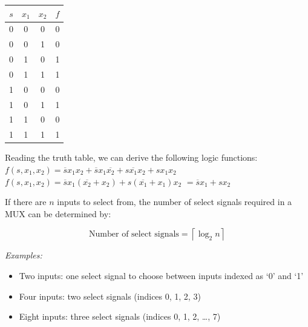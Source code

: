 \documentclass[12pt,openany]{book}
\begin{document}
					\begin{minipage}[htp]{0.45\textwidth}

					\begin{center}
					\begin{tabular}{|c|c|c|c|}
					\hline
					$s$ & $x_1$ & $x_2$ & $f$ \\
					\hline
					0   & 0     & 0     & 0   \\
					0   & 0     & 1     & 0   \\
					0   & 1     & 0     & 1   \\
					0   & 1     & 1     & 1   \\
					1   & 0     & 0     & 0   \\
					1   & 0     & 1     & 1   \\
					1   & 1     & 0     & 0   \\
					1   & 1     & 1     & 1   \\
					\hline
					\end{tabular}
					\end{center}
						
					\end{minipage}
					\hfill
					\vline
					\hfill
					\begin{minipage}[htp]{0.45\textwidth}
					Reading the truth table, we can derive the following logic functions:\newline
					\vspace*{3px}
			      	$f(s, x_1, x_2) = \overline{s} x_1 x_2 + \overline{s} x_1 \overline{x_2} + s \overline{x_1} x_2 + s x_1 x_2$\newline
			      	$f(s, x_1, x_2) = \overline{s}x_1 (\overline{x_2} + x_2) + s(\overline{x_1} + x_1)x_2$
			      	\newline
			      	$= \overline{s}x_1 + sx_2$
			      	\end{minipage}
					\newline
					\vspace*{10px}
			      	
					
			      	If there are \( n \) inputs to select from, the number of select signals required in a MUX can be determined by:
			      	
			      	\[
			      		\text{Number of select signals} = \left\lceil \log_2 n \right\rceil
			      	\]
			      	
					
			      	\textit{Examples:}
			      	\begin{itemize}
			      		\item[] Two inputs: one select signal to choose between inputs indexed as `0' and `1'
			      		\item[] Four inputs: two select signals (indices 0, 1, 2, 3)
			      		\item[] Eight inputs: three select signals (indices 0, 1, 2, \ldots, 7)
			      	\end{itemize}
			      	
\end{document}
